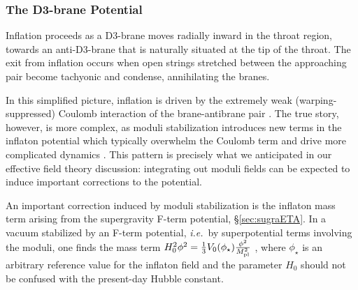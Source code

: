 \documentclass[12pt,letterpaper,rotate]{article}
\begin{document}
{\subsubsection{The D3-brane Potential}
\label{sec:gravity}

Inflation proceeds as a D3-brane moves radially inward in the throat region, towards an anti-D3-brane that is naturally situated at the tip of the throat.  
The exit from inflation occurs when open strings stretched between the approaching pair become tachyonic and condense, annihilating the branes.


In this simplified picture, inflation is driven by the extremely weak (warping-suppressed) Coulomb interaction of the brane-antibrane pair \cite{KKLMMT}. The true story, however, is more complex, as moduli stabilization introduces new terms in the inflaton potential which typically overwhelm the Coulomb term and drive more complicated dynamics \cite{KKLMMT,Baumann:2006th, Baumann:2007np, Baumann:2007ah, Krause:2007jk, Baumann:2008kq}. This pattern is precisely what we anticipated in our effective field theory discussion: integrating out moduli fields can be expected to induce important corrections to the potential.

\vskip 6pt
An important correction induced by moduli stabilization is the inflaton mass term arising from the supergravity F-term potential,
\S\ref{sec:sugraETA}.  In a vacuum stabilized by an F-term potential, {\it i.e.}~by superpotential terms involving the moduli,
one finds the mass term $H^2_0 \phi^2 = \frac{1}{3} V_0(\phi_\star) \frac{\phi^2}{M_{\rm pl}^2}$  \cite{KKLMMT},
where $\phi_\star$ is an arbitrary reference value for the inflaton field and the parameter $H_0$ should not be confused with the present-day Hubble constant.

}
\end{document}
